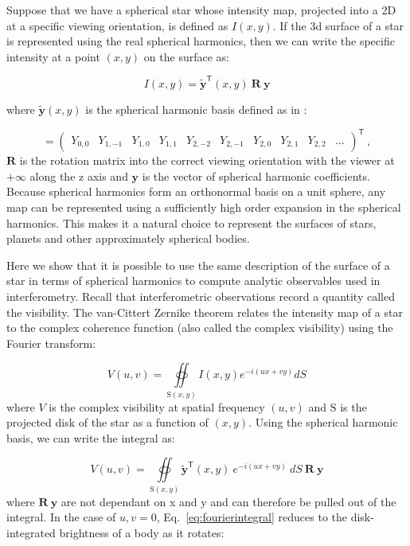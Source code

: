 \documentclass[modern]{aastex631}
\begin{document}
Suppose that we have a spherical star whose intensity map, projected into a 2D at a specific viewing orientation, is defined as $I(x,y)$. If the 3d surface of a star is represented using the real spherical harmonics, then we can write the specific intensity at a point $(x,y)$ on the surface as:

\begin{equation}
    I(x,y) = \mathbf{\tilde{y}}^\mathsf{T}(x,y) \ \mathbf{R} \ \mathbf{y}
\end{equation}

where $\mathbf{\tilde{y}}(x,y)$ is the spherical harmonic basis  defined as in \citet{starry2019}: 

\begin{equation}
    \label{eq:by}
    = \begin{pmatrix}
        Y_{0, 0} &
        Y_{1, -1} & Y_{1, 0} & Y_{1, 1} &
        Y_{2, -2} & Y_{2, -1} & Y_{2, 0} & Y_{2, 1} & Y_{2, 2} 
        & \dots
    \end{pmatrix}^\mathsf{T}
    \ ,
\end{equation}
$\mathbf{R}$ is the rotation matrix into the correct viewing orientation with the viewer at $+\infty$ along the z axis and $\mathbf{y}$ is the vector of spherical harmonic coefficients. Because spherical harmonics form an orthonormal basis on a unit sphere, any map can be represented using a sufficiently high order expansion in the spherical harmonics. This makes it a natural choice to represent the surfaces of stars, planets and other approximately spherical bodies.

Here we show that it is possible to use the same description of the surface of a star in terms of spherical harmonics to compute analytic observables used in interferometry. Recall that interferometric observations record a quantity called the visibility. The van-Cittert Zernike theorem relates the intensity map of a star to the complex coherence function (also called the complex visibility) using the Fourier transform:

\begin{equation} \label{eq:vcztheorem}
V(u,v) = \oiint\limits_{\mathrm{S}(x,y)} I(x,y) e^{-i(ux + vy)} dS
\end{equation}
where $V$ is the complex visibility at spatial frequency $(u,v)$ and $\mathrm{S}$ is the projected disk of the star as a function of $(x,y)$. Using the spherical harmonic basis, we can write the integral as:

\begin{equation} \label{eq:fourierintegral}
   V(u,v) = \oiint\limits_{\mathrm{S}(x,y)} \mathbf{\tilde{y}}^\mathsf{T}(x,y) \ e^{-i(ux + vy)} \ dS \ \mathbf{R} \ \mathbf{y}
\end{equation} 
where $\mathbf{R} \ \mathbf{y}$ are not dependant on x and y and can therefore be pulled out of the integral. In the case of $u, v = 0$, Eq.~\ref{eq:fourierintegral} reduces to the disk-integrated brightness of a body as it rotates:
\end{document}
